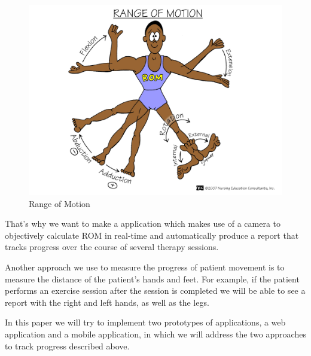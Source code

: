 \begin{figure}[htbp]
	\centerline{\includegraphics[scale=0.25]{fig/rangeofmotion.png}}  
  \caption{Range of Motion}
  \label{fig:rom-exemple}
\end{figure}

\par That's why we want to make a application which makes use of a camera to objectively 
calculate ROM in real-time and automatically produce a report that tracks progress over the course 
of several therapy sessions.

Another approach we use to measure the progress of patient movement is 
to measure the distance of the patient's hands and feet. For example, 
if the patient performs an exercise session after the session is completed we will 
be able to see a report with the right and left hands, as well as the legs.

In this paper we will try to implement two prototypes of applications, 
a web application and a mobile application, 
in which we will address the two approaches to track progress described above.

